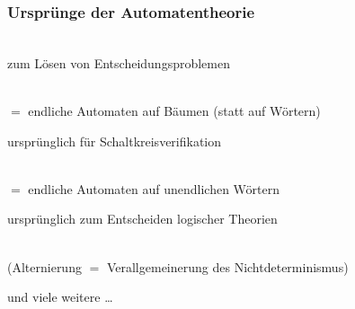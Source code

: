     \begin{frame}
    \frametitle{Ursprünge der Automatentheorie}
    
       \\
      zum Lösen von Entscheidungsproblemen
      
      \begin{Itemize}
        \item
           \\
          $=$ endliche Automaten auf Bäumen (statt auf Wörtern)
          \par\smallskip
          ursprünglich für Schaltkreisverifikation \\
          \Lit{[Church, 50er/60er]}
          \par\smallskip
        \item
           \\
          $=$ endliche Automaten auf unendlichen Wörtern
          \par\smallskip
          ursprünglich zum Entscheiden logischer Theorien \\
          \Lit{[Büchi 1962]}
          \par\smallskip
        \item
           \\
          (Alternierung $=$ Verallgemeinerung des Nichtdeterminismus)
          \par\smallskip
          \par\smallskip
         \item
           und viele weitere \dots
      \end{Itemize}
    
    \end{frame}

